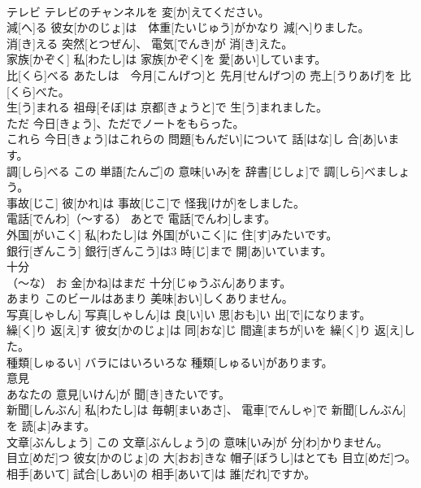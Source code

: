 \documentclass[8pt]{extreport}
\begin{document}
\begin{CJK}{UTF8}{min}
\\	テレビ	テレビのチャンネルを 変[か]えてください。		
\\	減[へ]る	彼女[かのじょ]は　体重[たいじゅう]がかなり 減[へ]りました。		
\\	消[き]える	突然[とつぜん]、 電気[でんき]が 消[き]えた。		
\\	家族[かぞく]	私[わたし]は 家族[かぞく]を 愛[あい]しています。		
\\	比[くら]べる	あたしは　今月[こんげつ]と 先月[せんげつ]の 売上[うりあげ]を 比[くら]べた。		
\\	生[う]まれる	祖母[そぼ]は 京都[きょうと]で 生[う]まれました。		
\\	ただ	今日[きょう]、ただでノートをもらった。		
\\	これら	今日[きょう]はこれらの 問題[もんだい]について 話[はな]し 合[あ]います。		
\\	調[しら]べる	この 単語[たんご]の 意味[いみ]を 辞書[じしょ]で 調[しら]べましょう。		
\\	事故[じこ]	彼[かれ]は 事故[じこ]で 怪我[けが]をしました。		
\\	電話[でんわ]（～する）	あとで 電話[でんわ]します。		
\\	外国[がいこく]	私[わたし]は 外国[がいこく]に 住[す]みたいです。		
\\	銀行[ぎんこう]	銀行[ぎんこう]は3 時[じ]まで 開[あ]いています。		
\\	十分
\\	[じゅうぶん]（～な）	お 金[かね]はまだ 十分[じゅうぶん]あります。		
\\	あまり	このビールはあまり 美味[おい]しくありません。		
\\	写真[しゃしん]	写真[しゃしん]は 良[い]い 思[おも]い 出[で]になります。		
\\	繰[く]り 返[え]す	彼女[かのじょ]は 同[おな]じ 間違[まちが]いを 繰[く]り 返[え]した。		
\\	種類[しゅるい]	バラにはいろいろな 種類[しゅるい]があります。		
\\	意見
\\	[いけん]	あなたの 意見[いけん]が 聞[き]きたいです。		
\\	新聞[しんぶん]	私[わたし]は 毎朝[まいあさ]、 電車[でんしゃ]で 新聞[しんぶん]を 読[よ]みます。		
\\	文章[ぶんしょう]	この 文章[ぶんしょう]の 意味[いみ]が 分[わ]かりません。		
\\	目立[めだ]つ	彼女[かのじょ]の 大[おお]きな 帽子[ぼうし]はとても 目立[めだ]つ。		
\\	相手[あいて]	試合[しあい]の 相手[あいて]は 誰[だれ]ですか。		

\end{CJK}
\end{document}
